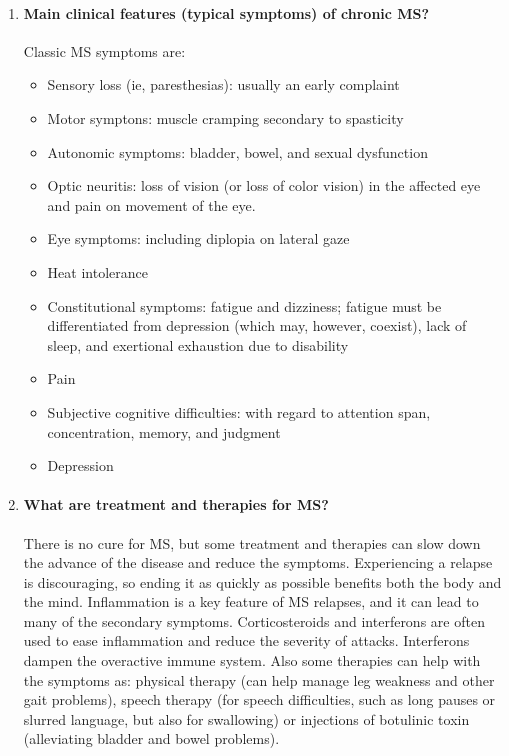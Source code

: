 \documentclass[12pt,article,oneside,a4paper]{memoir}
\begin{document}
\begin{enumerate}
\item \paragraph{Main clinical features (typical symptoms) of chronic MS?}
\label{question:MS-symptoms}

Classic MS symptoms are:
\begin{itemize}
\item Sensory loss (ie, paresthesias): usually an early complaint
\item Motor symptons: muscle cramping secondary to spasticity
\item Autonomic symptoms: bladder, bowel, and sexual dysfunction
\item Optic neuritis: loss of vision (or loss of color vision) in the affected
eye and pain on movement of the eye. 
\item Eye symptoms: including diplopia on lateral gaze
\item Heat intolerance
\item Constitutional symptoms: fatigue and dizziness; fatigue must be
differentiated from depression (which may, however, coexist), lack of sleep,
and exertional exhaustion due to disability
\item Pain
\item Subjective cognitive difficulties: with regard to attention span,
concentration, memory, and judgment
\item Depression
\end{itemize}

\item \paragraph{What are treatment and therapies for MS?}
There is no cure for MS, but some treatment and therapies can slow down the
advance of the disease and reduce the symptoms.
Experiencing a relapse is discouraging, so ending it as quickly as possible
benefits both the body and the mind. Inflammation is a key feature of MS
relapses, and it can lead to many of the secondary symptoms. Corticosteroids
and interferons are often used to ease inflammation and reduce the severity of
attacks. Interferons dampen the overactive immune system. Also some therapies
can help with the symptoms as: physical therapy (can help manage leg weakness
and other gait problems), speech therapy (for speech difficulties, such as long
pauses or slurred language, but also for swallowing) or injections of botulinic
toxin (alleviating bladder and bowel problems).


\end{enumerate}
\end{document}
